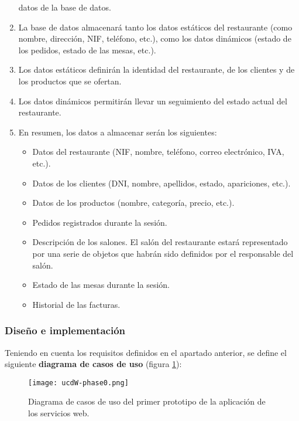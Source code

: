 \begin{enumerate}
datos de la base de datos.
\item La base de datos almacenará tanto los datos estáticos del restaurante 
(como nombre, dirección, NIF, teléfono, etc.), como los datos dinámicos (estado 
de los pedidos, estado de las mesas, etc.).
\item Los datos estáticos definirán la identidad del restaurante, de los
clientes y de los productos que se ofertan.
\item Los datos dinámicos permitirán llevar un seguimiento del estado actual
del restaurante.
\item En resumen, los datos a almacenar serán los siguientes:
  \begin{itemize}
  \item Datos del restaurante (NIF, nombre, teléfono, correo electrónico, IVA, 
  etc.).
  \item Datos de los clientes (DNI, nombre, apellidos, estado, apariciones,
  etc.).
  \item Datos de los productos (nombre, categoría, precio, etc.).
  \item Pedidos registrados durante la sesión.
  \item Descripción de los salones. El salón del restaurante estará
  representado por una serie de objetos que habrán sido definidos por el
  responsable del salón.
  \item Estado de las mesas durante la sesión.
  \item Historial de las facturas.
  \end{itemize}
\end{enumerate}
\newpage
\subsubsection{Diseño e implementación}
Teniendo en cuenta los requisitos definidos en el apartado anterior, se define
el siguiente \textbf{diagrama de casos de uso} (figura \ref{fig:ucdW-phase0}):

  \begin{figure}[H]
    \begin{center}
      \texttt{[image: ucdW-phase0.png]}
      \caption{Diagrama de casos de uso del primer prototipo de la aplicación
      de los servicios web.}
      \label{fig:ucdW-phase0}
    \end{center}
  \end{figure}

